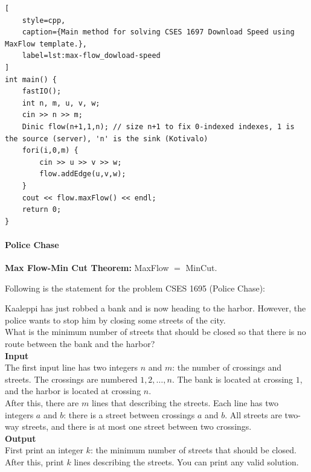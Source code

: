 \documentclass[letterpaper,landscape]{article}
\begin{document}
\begin{lstlisting}[
    style=cpp,
    caption={Main method for solving CSES 1697 Download Speed using MaxFlow template.},
    label=lst:max-flow_dowload-speed
]
int main() {
    fastIO();
    int n, m, u, v, w;
    cin >> n >> m;
    Dinic flow(n+1,1,n); // size n+1 to fix 0-indexed indexes, 1 is the source (server), 'n' is the sink (Kotivalo)
    fori(i,0,m) {
        cin >> u >> v >> w;
        flow.addEdge(u,v,w);
    }
    cout << flow.maxFlow() << endl;
    return 0;
}
\end{lstlisting}

\paragraph{Police Chase}

\textbf{Max Flow-Min Cut Theorem:} MaxFlow $=$ MinCut.

Following is the statement for the problem CSES 1695 (Police Chase):

\begin{IOFrame}
\sffamily\raggedright
\setlength{\parindent}{0pt}
\setlength{\parskip}{0.4em}
Kaaleppi has just robbed a bank and is now heading to the harbor. However, the police wants to stop him by closing some streets of the city. \\[0.2cm]
What is the minimum number of streets that should be closed so that there is no route between the bank and the harbor? \\

\textbf{Input} \\[0.1cm]

\noindent The first input line has two integers $n$ and $m$: the number of crossings and streets. The crossings are numbered $1,2,\dots,n$. The bank is located at crossing $1$, and the harbor is located at crossing $n$. \\[0.2cm]
After this, there are $m$ lines that describing the streets. Each line has two integers $a$ and $b$: there is a street between crossings $a$ and $b$. All streets are two-way streets, and there is at most one street between two crossings. \\

\textbf{Output} \\[0.1cm]

\noindent First print an integer $k$: the minimum number of streets that should be closed. After this, print $k$ lines describing the streets. You can print any valid solution.
\end{IOFrame}
\end{document}
